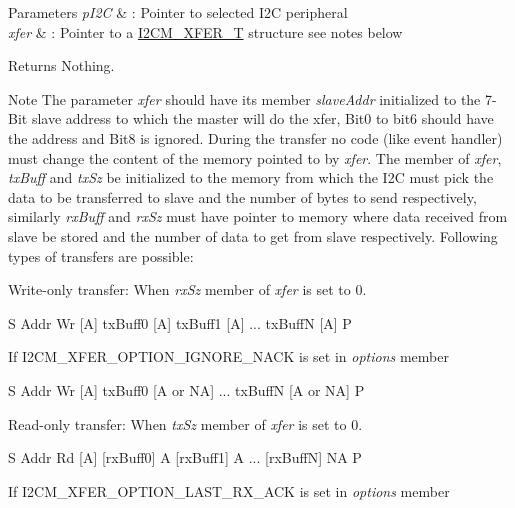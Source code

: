 \begin{DoxyParams}{Parameters}
{\em p\+I2C} & \+: Pointer to selected I2C peripheral \\
\hline
{\em xfer} & \+: Pointer to a \hyperlink{struct_i2_c_m___x_f_e_r___t}{I2\+C\+M\+\_\+\+X\+F\+E\+R\+\_\+T} structure see notes below \\
\hline
\end{DoxyParams}
\begin{DoxyReturn}{Returns}
Nothing. 
\end{DoxyReturn}
\begin{DoxyNote}{Note}
The parameter {\itshape xfer} should have its member {\itshape slave\+Addr} initialized to the 7-\/\+Bit slave address to which the master will do the xfer, Bit0 to bit6 should have the address and Bit8 is ignored. During the transfer no code (like event handler) must change the content of the memory pointed to by {\itshape xfer}. The member of {\itshape xfer}, {\itshape tx\+Buff} and {\itshape tx\+Sz} be initialized to the memory from which the I2C must pick the data to be transferred to slave and the number of bytes to send respectively, similarly {\itshape rx\+Buff} and {\itshape rx\+Sz} must have pointer to memory where data received from slave be stored and the number of data to get from slave respectively. Following types of transfers are possible\+:
\begin{DoxyItemize}
\item Write-\/only transfer\+: When {\itshape rx\+Sz} member of {\itshape xfer} is set to 0. \begin{DoxyVerb}   S Addr Wr [A] txBuff0 [A] txBuff1 [A] ... txBuffN [A] P
\end{DoxyVerb}

\begin{DoxyItemize}
\item If I2\+C\+M\+\_\+\+X\+F\+E\+R\+\_\+\+O\+P\+T\+I\+O\+N\+\_\+\+I\+G\+N\+O\+R\+E\+\_\+\+N\+A\+CK is set in {\itshape options} member

S Addr Wr \mbox{[}A\mbox{]} tx\+Buff0 \mbox{[}A or NA\mbox{]} ... tx\+BuffN \mbox{[}A or NA\mbox{]} P
\end{DoxyItemize}
\item Read-\/only transfer\+: When {\itshape tx\+Sz} member of {\itshape xfer} is set to 0. \begin{DoxyVerb}   S Addr Rd [A] [rxBuff0] A [rxBuff1] A ... [rxBuffN] NA P
\end{DoxyVerb}

\begin{DoxyItemize}
\item If I2\+C\+M\+\_\+\+X\+F\+E\+R\+\_\+\+O\+P\+T\+I\+O\+N\+\_\+\+L\+A\+S\+T\+\_\+\+R\+X\+\_\+\+A\+CK is set in {\itshape options} member


\end{DoxyItemize}
\end{DoxyItemize}
\end{DoxyNote}
